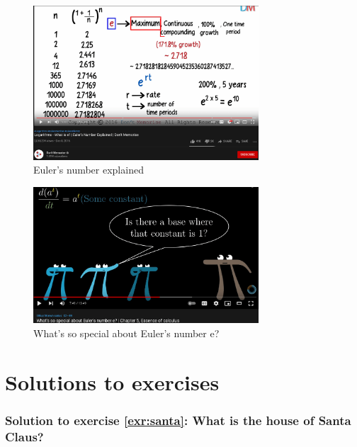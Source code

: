\documentclass[
  12pt,
  oneside]{book}
\theoremstyle{definition}
\theoremstyle{definition}
\theoremstyle{definition}
\theoremstyle{definition}
\theoremstyle{remark}
\begin{document}
\begin{figure}
\centering
\includegraphics[width=0.75\textwidth,height=\textheight]{fig/whatse.png}
\caption{\label{fig:whatse} Euler's number explained}
\end{figure}

\begin{figure}
\centering
\includegraphics[width=0.75\textwidth,height=\textheight]{fig/euler.png}
\caption{\label{fig:euler} What's so special about Euler's number e?}
\end{figure}

\hypertarget{solutions-to-exercises}{%
\chapter{Solutions to exercises}\label{solutions-to-exercises}}

\hypertarget{sol:santa}{%
\subsection*{Solution to exercise \ref{exr:santa}: What is the house of Santa Claus?}\label{sol:santa}}
\end{document}
